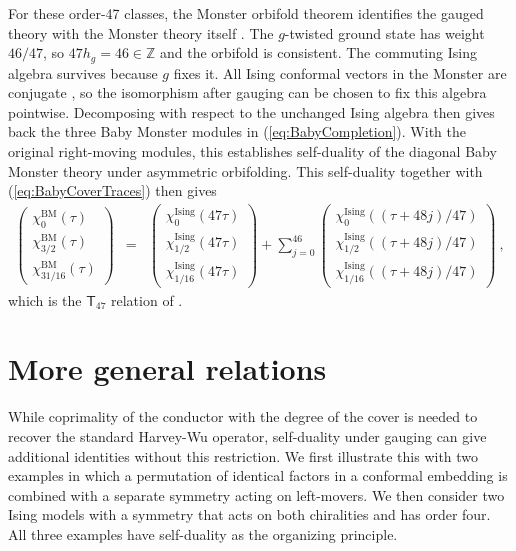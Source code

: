 \documentclass[12pt]{article}
\numberwithin{equation}{section}
\newcommand{\bea}{\begin{eqnarray}}
\newcommand{\eea}{\end{eqnarray}}
\def\ZZ{\mathbb{Z}}
\theoremstyle{remark}
\begin{document}
For these order-47 classes, the Monster orbifold theorem identifies the gauged theory with the Monster theory itself \cite{Paquette:2017xui}. The $g$-twisted ground state has weight $46/47$, so $47h_g=46\in \ZZ$ and the orbifold is consistent. The commuting Ising algebra survives because $g$ fixes it. All Ising conformal vectors in the Monster are conjugate \cite{Chen:2014aia}, so the isomorphism after gauging can be chosen to fix this algebra pointwise. Decomposing with respect to the unchanged Ising algebra then gives back the three Baby Monster modules in (\ref{eq:BabyCompletion}). With the original right-moving modules, this establishes self-duality of the diagonal Baby Monster theory under asymmetric orbifolding.
This self-duality together with (\ref{eq:BabyCoverTraces}) then gives
\bea
\begin{pmatrix}
\chi^{\mathrm{BM}}_0(\tau)\\
\chi^{\mathrm{BM}}_{3/2}(\tau)\\
\chi^{\mathrm{BM}}_{31/16}(\tau)
\end{pmatrix}
&=&\begin{pmatrix}
\chi^{\mathrm{Ising}}_0(47\tau)\\
\chi^{\mathrm{Ising}}_{1/2}(47\tau)\\
\chi^{\mathrm{Ising}}_{1/16}(47\tau)
\end{pmatrix}
+\sum_{j=0}^{46}\begin{pmatrix}
\chi^{\mathrm{Ising}}_0((\tau+48j)/47)\\
\chi^{\mathrm{Ising}}_{1/2}((\tau+48j)/47)\\
\chi^{\mathrm{Ising}}_{1/16}((\tau+48j)/47)
\end{pmatrix}~,
\eea
which is the $\mathsf T_{47}$ relation of \cite{Harvey:2018rdc}.

\section{More general relations}
\label{sec:generalized}

While coprimality of the conductor with the degree of the cover is needed to recover the standard Harvey-Wu operator, self-duality under gauging can give additional identities without this restriction. We first illustrate this with two examples in which a permutation of identical factors in a conformal embedding is combined with a separate symmetry acting on left-movers. We then consider two Ising models with a symmetry that acts on both chiralities and has order four. All three examples have self-duality as the organizing principle.
\end{document}
